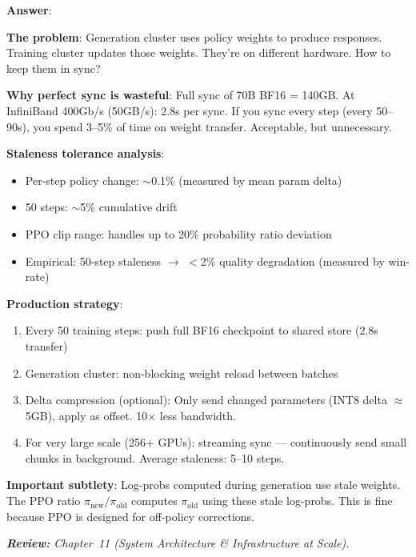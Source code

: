 \begin{questionbox}
\textbf{Answer}:

\textbf{The problem}: Generation cluster uses policy weights to produce responses. Training cluster updates those weights. They’re on different hardware. How to keep them in sync?

\textbf{Why perfect sync is wasteful}: Full sync of 70B BF16 = 140GB. At InfiniBand 400Gb/s (50GB/s): 2.8s per sync. If you sync every step (every 50--90s), you spend 3--5\% of time on weight transfer. Acceptable, but unnecessary.

\textbf{Staleness tolerance analysis}:

\begin{itemize}
  \item Per-step policy change: $\sim$0.1\% (measured by mean param delta)
  \item 50 steps: $\sim$5\% cumulative drift
  \item PPO clip range: handles up to 20\% probability ratio deviation
  \item Empirical: 50-step staleness $\rightarrow$ $<$2\% quality degradation (measured by win-rate)
\end{itemize}

\textbf{Production strategy}:

\begin{enumerate}
  \item Every 50 training steps: push full BF16 checkpoint to shared store (2.8s transfer)
  \item Generation cluster: non-blocking weight reload between batches
  \item Delta compression (optional): Only send changed parameters (INT8 delta $\approx$ 5GB), apply as offset. 10$\times$ less bandwidth.
  \item For very large scale (256+ GPUs): streaming sync --- continuously send small chunks in background. Average staleness: 5--10 steps.
\end{enumerate}

\textbf{Important subtlety}: Log-probs computed during generation use stale weights. The PPO ratio $\pi_\text{new}/\pi_\text{old}$ computes $\pi_\text{old}$ using these stale log-probs. This is fine because PPO is designed for off-policy corrections.

\emph{\textbf{Review:} Chapter~11 (System Architecture \& Infrastructure at Scale).}
\end{questionbox}


